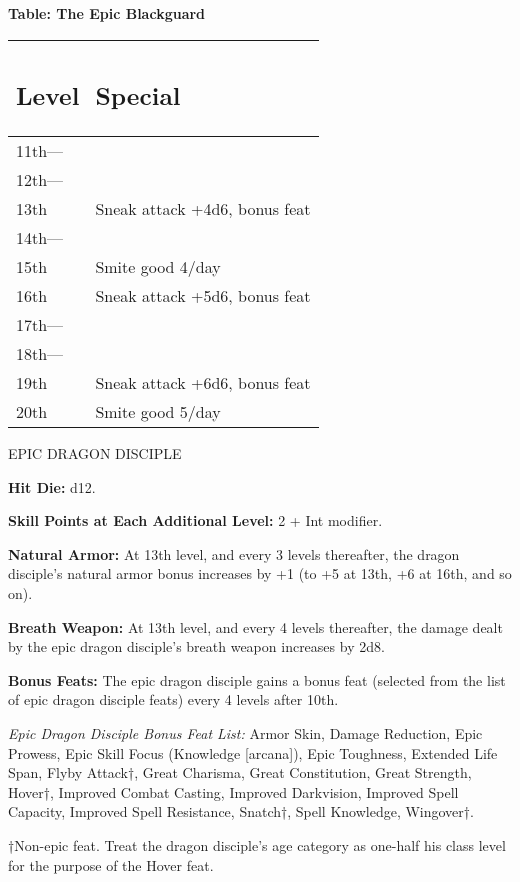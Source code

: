 \documentclass{article}
\begin{document}
\textbf{Table: The Epic Blackguard }

\begin{tabular}{|>{\raggedright}p{27pt}|>{\raggedright}p{126pt}|}
\hline
\subsection*{L\textbf{evel}} & \subsection*{S\textbf{pecial }}\tabularnewline
\hline
11th--- &  \tabularnewline
\hline
12th--- &  \tabularnewline
\hline
13th & Sneak attack +4d6, bonus feat \tabularnewline
\hline
14th--- & \tabularnewline
\hline
15th & Smite good 4/day\tabularnewline
\hline
16th & Sneak attack +5d6, bonus feat \tabularnewline
\hline
17th--- &  \tabularnewline
\hline
18th--- &  \tabularnewline
\hline
19th & Sneak attack +6d6, bonus feat \tabularnewline
\hline
20th & Smite good 5/day\tabularnewline
\hline
\end{tabular}

\vspace{12pt}
{\LARGE{}EPIC DRAGON DISCIPLE}

\textbf{Hit Die: }d12.

\textbf{Skill Points at Each Additional Level: }2 + Int modifier.

\textbf{Natural Armor: }At 13th level, and every 3 levels thereafter, the dragon 
disciple's natural armor bonus increases by +1 (to +5 at 13th, +6 at 16th, and 
so on).

\textbf{Breath Weapon: }At 13th level, and every 4 levels thereafter, the damage 
dealt by the epic dragon disciple's breath weapon increases by 2d8.

\textbf{Bonus Feats: }The epic dragon disciple gains a bonus feat (selected from 
the list of epic dragon disciple feats) every 4 levels after 10th.

\textit{Epic Dragon Disciple Bonus Feat List: }Armor Skin, Damage Reduction, Epic 
Prowess, Epic Skill Focus (Knowledge [arcana]), Epic Toughness, Extended Life Span, 
Flyby Attack†, Great Charisma, Great Constitution, Great Strength, Hover†, 
Improved Combat Casting, Improved Darkvision, Improved Spell Capacity, Improved 
Spell Resistance, Snatch†, Spell Knowledge, Wingover†.

†Non-epic feat. Treat the dragon disciple's age category as one-half his class 
level for the purpose of the Hover feat.
\end{document}
